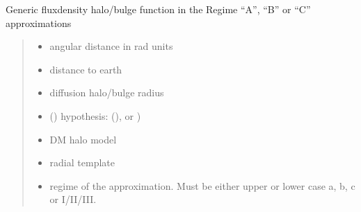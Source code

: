 \documentclass[letterpaper,10pt,english]{sphinxmanual}
\begin{document}
\begin{fulllineitems}
\label{\detokenize{diffsph.profiles:diffsph.profiles.hfactors.H_fluxdens}}
\pysigstartsignatures
{}
\pysigstopsignatures
\sphinxAtStartPar
Generic flux\sphinxhyphen{}density halo/bulge function in the Regime “A”, “B” or “C” approximations
\begin{quote}\begin{description}
\begin{itemize}
\item {} 
\sphinxAtStartPar
{} \textendash{} angular distance in rad units

\item {} 
\sphinxAtStartPar
{} \textendash{} distance to earth

\item {} 
\sphinxAtStartPar
{} \textendash{} diffusion halo/bulge radius

\item {} 
\sphinxAtStartPar
{} () \textendash{} hypothesis:  (),  or )

\item {} 
\sphinxAtStartPar
{} \textendash{} DM halo model

\item {} 
\sphinxAtStartPar
{} \textendash{} radial template

\item {} 
\sphinxAtStartPar
{} \textendash{} regime of the approximation. Must be either upper or lower case a, b, c or I/II/III.


\end{itemize}
\end{description}
\end{quote}
\end{fulllineitems}
\end{document}
